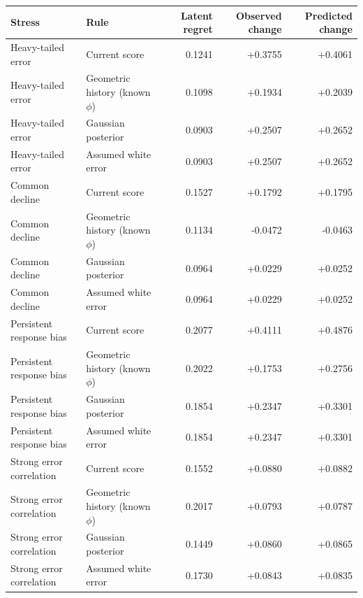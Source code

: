 \begin{tabular}{llrrr}
\toprule
Stress & Rule & Latent regret & Observed change & Predicted change \\
\midrule
Heavy-tailed error & Current score & 0.1241 & +0.3755 & +0.4061 \\
Heavy-tailed error & Geometric history (known $\phi$) & 0.1098 & +0.1934 & +0.2039 \\
Heavy-tailed error & Gaussian posterior & 0.0903 & +0.2507 & +0.2652 \\
Heavy-tailed error & Assumed white error & 0.0903 & +0.2507 & +0.2652 \\
Common decline & Current score & 0.1527 & +0.1792 & +0.1795 \\
Common decline & Geometric history (known $\phi$) & 0.1134 & -0.0472 & -0.0463 \\
Common decline & Gaussian posterior & 0.0964 & +0.0229 & +0.0252 \\
Common decline & Assumed white error & 0.0964 & +0.0229 & +0.0252 \\
Persistent response bias & Current score & 0.2077 & +0.4111 & +0.4876 \\
Persistent response bias & Geometric history (known $\phi$) & 0.2022 & +0.1753 & +0.2756 \\
Persistent response bias & Gaussian posterior & 0.1854 & +0.2347 & +0.3301 \\
Persistent response bias & Assumed white error & 0.1854 & +0.2347 & +0.3301 \\
Strong error correlation & Current score & 0.1552 & +0.0880 & +0.0882 \\
Strong error correlation & Geometric history (known $\phi$) & 0.2017 & +0.0793 & +0.0787 \\
Strong error correlation & Gaussian posterior & 0.1449 & +0.0860 & +0.0865 \\
Strong error correlation & Assumed white error & 0.1730 & +0.0843 & +0.0835 \\
\bottomrule
\end{tabular}
